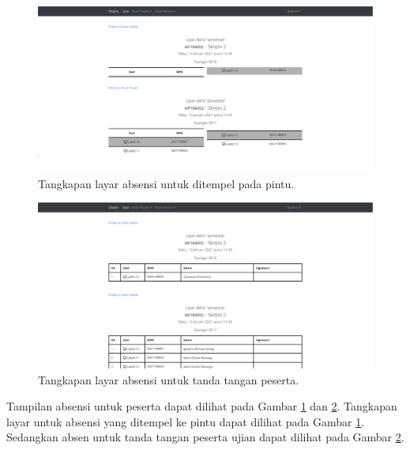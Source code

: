     
    \begin{figure}
        \centering
        \includegraphics[width=0.7\paperwidth]{Gambar/implemented-interface/admin/absen-pintu.png}
        \caption{Tangkapan layar absensi untuk ditempel pada pintu.}
        \label{fig:screenshot-admin-absen-pintu}
    \end{figure}
    \begin{figure}
        \centering
        \includegraphics[width=0.7\paperwidth]{Gambar/implemented-interface/admin/absen-ttd.png}
        \caption{Tangkapan layar absensi untuk tanda tangan peserta.}
        \label{fig:screenshot-admin-absen-ttd}
    \end{figure}
    Tampilan absensi untuk peserta dapat dilihat pada Gambar \ref{fig:screenshot-admin-absen-pintu} dan
    \ref{fig:screenshot-admin-absen-ttd}. Tangkapan layar untuk absensi yang ditempel ke pintu
    dapat dilihat pada Gambar \ref{fig:screenshot-admin-absen-pintu}.
    Sedangkan absen untuk tanda tangan peserta ujian dapat dilihat pada Gambar 
    \ref{fig:screenshot-admin-absen-ttd}.
    
